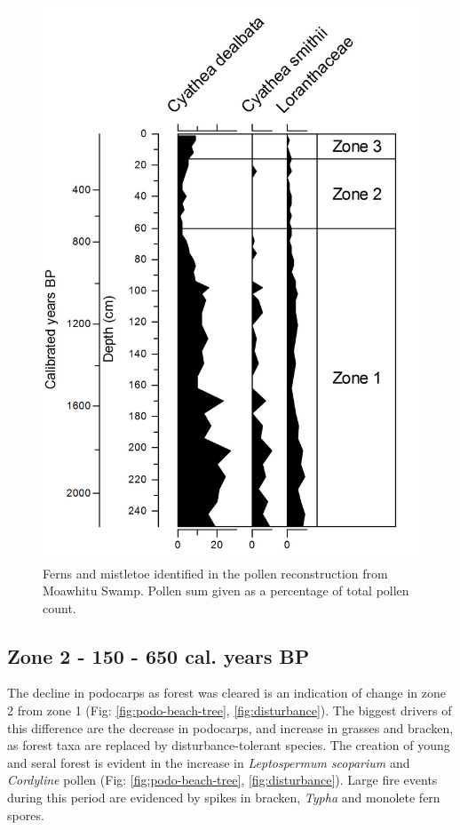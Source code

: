 \documentclass{article}
\begin{document}
\begin{figure}
	\centering
	\includegraphics[scale=0.15]{ferns-zone.jpg}
	\caption[Ferns and mistletoe identified in the pollen reconstruction from Moawhitu Swamp.]{Ferns and mistletoe identified in the pollen reconstruction from Moawhitu Swamp. Pollen sum given as a percentage of total pollen count.}
	\label{fig:ferns}
\end{figure}

\subsection{Zone 2 - 150 - 650 cal. years BP}
The decline in podocarps as forest was cleared is an indication of change in zone 2 from zone 1 (Fig: \ref{fig:podo-beach-tree}, \ref{fig:disturbance}). The biggest drivers of this difference are the decrease in podocarps, and increase in grasses and bracken, as forest taxa are replaced by disturbance-tolerant species.  The creation of young and seral forest is evident in the increase in \textit{Leptospermum scoparium}  and \textit{Cordyline} pollen (Fig: \ref{fig:podo-beach-tree}, \ref{fig:disturbance}).  Large fire events during this period are evidenced by spikes in bracken, \textit{Typha} and monolete fern spores.  
\end{document}

